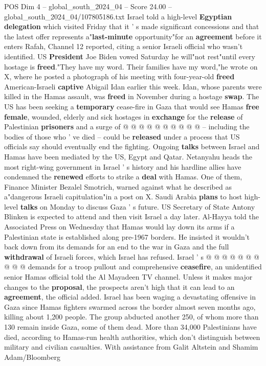 \begin{textsample}{POS Dim 4 – global\_south\_2024\_04 – Score 24.00 – global\_south\_2024\_04/107805186.txt}
Israel told a high-level \textbf{Egyptian} \textbf{delegation} which visited Friday that it ' s made significant concessions and that the latest offer represents a"\textbf{last-minute} opportunity"for an \textbf{agreement} before it enters Rafah, Channel 12 reported, citing a senior Israeli official who wasn't identified.
US \textbf{President} Joe Biden vowed Saturday he will"not rest"until every hostage is \textbf{freed}."They have my word.
Their families have my word,"he wrote on X, where he posted a photograph of his meeting with four-year-old \textbf{freed} American-Israeli \textbf{captive} Abigail Idan earlier this week.
Idan, whose parents were killed in the Hamas assault, was \textbf{freed} in November during a hostage \textbf{swap}.
The US has been seeking a \textbf{temporary} cease-fire in Gaza that would see Hamas \textbf{free} \textbf{female}, wounded, elderly and sick hostages in \textbf{exchange} for the \textbf{release} of Palestinian \textbf{prisoners} and a surge of @ @ @ @ @ @ @ @ @ @ -- including the bodies of those who ' ve died -- could be \textbf{released} under a process that US officials say should eventually end the fighting.
Ongoing \textbf{talks} between Israel and Hamas have been mediated by the US, Egypt and Qatar.
Netanyahu heads the most right-wing government in Israel ' s history and his hardline allies have condemned the \textbf{renewed} efforts to strike a \textbf{deal} with Hamas.
One of them, Finance Minister Bezalel Smotrich, warned against what he described as a"dangerous Israeli capitulation"in a post on X.
Saudi Arabia \textbf{plans} to host high-level \textbf{talks} on Monday to discuss Gaza ' s future.
US Secretary of State Antony Blinken is expected to attend and then visit Israel a day later.
Al-Hayya told the Associated Press on Wednesday that Hamas would lay down its arms if a Palestinian state is established along pre-1967 borders.
He insisted it wouldn't back down from its demands for an end to the war in Gaza and the full \textbf{withdrawal} of Israeli forces, which Israel has refused.
Israel ' s @ @ @ @ @ @ @ @ @ @ demands for a troop pullout and comprehensive \textbf{ceasefire}, an unidentified senior Hamas official told the Al Mayadeen TV channel.
Unless it makes major changes to the \textbf{proposal}, the prospects aren't high that it can lead to an \textbf{agreement}, the official added.
Israel has been waging a devastating offensive in Gaza since Hamas fighters swarmed across the border almost seven months ago, killing about 1,200 people.
The group abducted another 250, of whom more than 130 remain inside Gaza, some of them dead.
More than 34,000 Palestinians have died, according to Hamas-run health authorities, which don't distinguish between military and civilian casualties.
With assistance from Galit Altstein and Shamim Adam/Bloomberg

\end{textsample}

